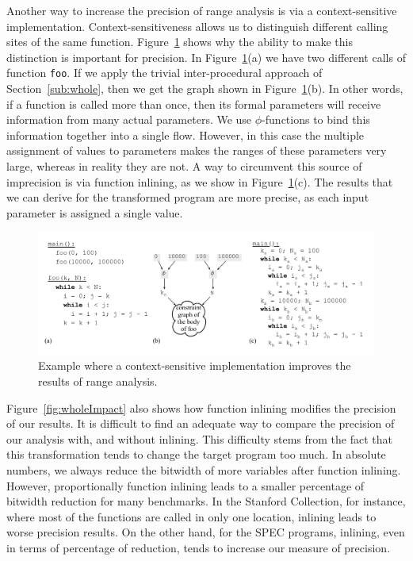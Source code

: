 \documentclass[preprint]{elsarticle}
\begin{document}
Another way to increase the precision of range analysis is via a
context-sensitive implementation.
Context-sensitiveness allows us to distinguish different calling sites of
the same function.
Figure~\ref{fig:context} shows why the ability to make this distinction is
important for precision.
In Figure~\ref{fig:context}(a) we have two different calls of function
\texttt{foo}.
If we apply the trivial inter-procedural approach of Section~\ref{sub:whole},
then we get the graph shown in Figure~\ref{fig:context}(b).
In other words, if a function is called more than once, then its formal
parameters will receive information from many actual parameters.
We use $\phi$-functions to bind this information together into a single
flow.
However, in this case the multiple assignment of values to parameters
makes the ranges of these parameters very large, whereas in reality they
are not.
A way to circumvent this source of imprecision is via function inlining,
as we show in Figure~\ref{fig:context}(c).
The results that we can derive for the transformed program are more
precise, as each input parameter is assigned a single value.

\begin{figure}[t!]
\begin{center}
\includegraphics[width=\textwidth]{images/context}
\end{center}
\caption{\label{fig:context}
Example where a context-sensitive implementation improves the results of
range analysis.
}
\end{figure}

Figure~\ref{fig:wholeImpact} also shows how function inlining modifies the
precision of our results.
It is difficult to find an adequate way to compare the precision of
our analysis with, and without inlining.
This difficulty stems from the fact that this transformation tends to change
the target program too much.
In absolute numbers, we always reduce the bitwidth of more variables after
function inlining.
However, proportionally function inlining leads to a smaller percentage of
bitwidth reduction for many benchmarks.
In the Stanford Collection, for instance, where most of the functions are
called in only one location, inlining leads to worse precision results.
On the other hand, for the SPEC programs, inlining, even in terms of
percentage of reduction, tends to increase our measure of precision.
\end{document}
